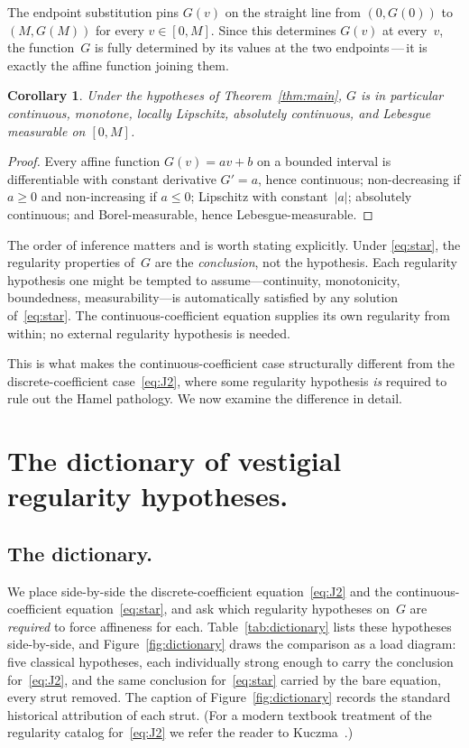 \documentclass{article}
\theoremstyle{plain}
\newtheorem{corollary}[theorem]{Corollary}
\theoremstyle{definition}
\begin{document}
The endpoint substitution pins $G(v)$ on the straight line from
$(0,G(0))$ to $(M,G(M))$ for every $v\in[0,M]$. Since this determines
$G(v)$ at every~$v$, the function~$G$ is fully determined by its values
at the two endpoints\,---\,it is exactly the affine function joining them.

\begin{corollary}\label{cor:regularity}
Under the hypotheses of Theorem~\ref{thm:main}, $G$ is in particular
continuous, monotone, locally Lipschitz, absolutely continuous, and
Lebesgue measurable on $[0,M]$.
\end{corollary}

\begin{proof}
Every affine function $G(v)=av+b$ on a bounded interval is differentiable
with constant derivative $G'=a$, hence continuous; non-decreasing if
$a\ge0$ and non-increasing if $a\le0$; Lipschitz with constant~$|a|$;
absolutely continuous; and Borel-measurable, hence Lebesgue-measurable.
\end{proof}

The order of inference matters and is worth stating explicitly. Under
\eqref{eq:star}, the regularity properties of~$G$ are the
\emph{conclusion}, not the hypothesis. Each regularity hypothesis one
might be tempted to assume---continuity, monotonicity, boundedness,
measurability---is automatically satisfied by any solution
of~\eqref{eq:star}. The continuous-coefficient equation supplies its own
regularity from within; no external regularity hypothesis is needed.

This is what makes the continuous-coefficient case structurally different
from the discrete-coefficient case~\eqref{eq:J2}, where some regularity
hypothesis \emph{is} required to rule out the Hamel pathology. We now
examine the difference in detail.

\section{The dictionary of vestigial regularity hypotheses.}
\label{sec:dictionary}

\subsection{The dictionary.}
\label{ssec:dict-table}

We place side-by-side the discrete-coefficient equation~\eqref{eq:J2}
and the continuous-coefficient equation~\eqref{eq:star}, and ask which
regularity hypotheses on~$G$ are \emph{required} to force affineness
for each. Table~\ref{tab:dictionary} lists these hypotheses side-by-side,
and Figure~\ref{fig:dictionary} draws the comparison as a load
diagram: five classical hypotheses, each individually strong enough
to carry the conclusion for~\eqref{eq:J2}, and the same conclusion
for~\eqref{eq:star} carried by the bare equation, every strut
removed. The caption of Figure~\ref{fig:dictionary} records the standard historical attribution of
each strut. (For a modern textbook treatment of the regularity
catalog for~\eqref{eq:J2} we refer the reader to
Kuczma~\cite[\S13.2]{Kuczma2009}.)
\end{document}
